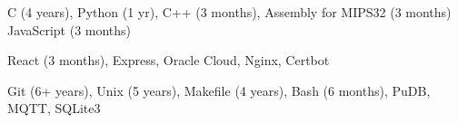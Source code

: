 
\begin{cvskills}
        {C (4 years), Python (1 yr), C++ (3 months), Assembly for MIPS32 (3 months) JavaScript (3 months)} %

        {React (3 months), Express, Oracle Cloud, Nginx, Certbot} %
        
	{Git (6+ years), Unix (5 years), Makefile (4 years), Bash (6 months), PuDB, MQTT, SQLite3}
\end{cvskills}
